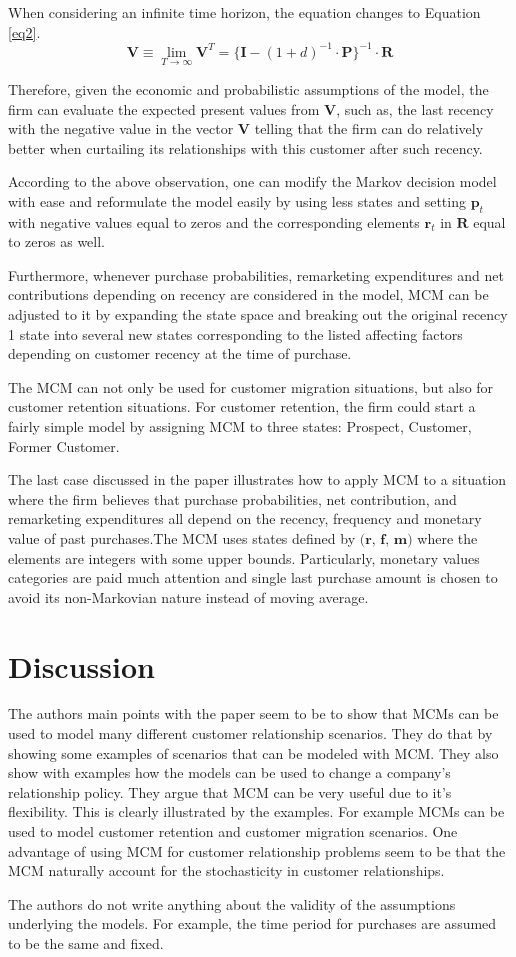 \documentclass[11pt]{article}
\begin{document}
When considering an infinite time horizon, the equation changes to Equation \ref{eq2}.
\begin{equation}\label{eq2}
\textbf{V} \equiv \lim_{T \rightarrow \infty} \textbf{V}^T = \{\textbf{I} - (1 + d)^{-1} \cdot \textbf{P} \}^{-1} \cdot \textbf{R}
\end{equation}


Therefore, given the economic and probabilistic assumptions of the model, the firm can evaluate the expected present values from $\textbf{V}$, such as, the last recency with the negative value in the vector $\textbf{V}$ telling that the firm can do relatively better when curtailing its relationships with this customer after such recency.

According to the above observation, one can modify the Markov decision model with ease and reformulate the model easily by using less states and setting $\textbf{p}_t$ with negative values equal to zeros and the corresponding elements $\textbf{r}_t$ in $\textbf{R}$ equal to zeros as well.

Furthermore, whenever purchase probabilities, remarketing expenditures and net contributions depending on recency are considered in the model, MCM can be adjusted to it by expanding the state space and breaking out the original recency 1 state into several new states corresponding to the listed affecting factors depending on customer recency at the time of purchase. 

The MCM can not only be used for customer migration situations, but also for customer retention situations. For customer retention, the firm could start a fairly simple model by assigning MCM to three states:  Prospect, Customer, Former Customer. 

The last case discussed in the paper illustrates how to apply MCM to a situation where the firm believes that purchase probabilities, net contribution, and remarketing expenditures all depend on the recency, frequency and monetary value of past purchases.The MCM uses states defined by $\textbf{(r, f, m)}$ where the elements are integers with some upper bounds. Particularly, monetary values categories are paid much attention and single last purchase amount is chosen to avoid its non-Markovian nature instead of moving average.




\section{Discussion}
The authors main points with the paper seem to be to show that MCMs can be used to model many different customer relationship scenarios. They do that by showing some examples of scenarios that can be modeled with MCM. They also show with examples how the models can be used to change a company's relationship policy. They argue that MCM can be very useful due to it's flexibility. This is clearly illustrated by the examples. For example MCMs can be used to model customer retention and customer migration scenarios. One advantage of using MCM for customer relationship problems seem to be that the MCM naturally account for the stochasticity in customer relationships.

The authors do not write anything about the validity of the assumptions underlying the models. 
For example, the time period for purchases are assumed to be the same and fixed.

\end{document}
